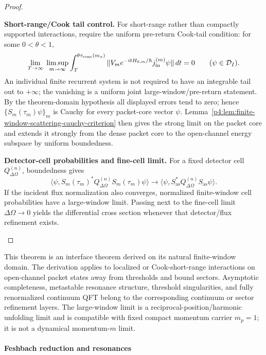 \documentclass[12pt,a4paper]{article}
\begin{document}
\begin{proof}
\begin{proofsteps}
\item \textbf{Short-range/Cook tail control.}
For short-range rather than compactly supported interactions, require the
uniform pre-return Cook-tail condition: for some \(0<\theta<1\),
\[
\lim_{T\to\infty}\;
\limsup_{m\to\infty}
\int_T^{\theta\tau_{\rm cone}(m_x)}
\|V_m e^{-itH_{0,m}/\hbar}j_{\rm in}^{(m)}\psi\|\,dt
=0
\qquad(\psi\in\mathcal D_I).
\]
An individual finite recurrent system is not required to have an integrable
tail out to \(+\infty\); the vanishing is a uniform joint
large-window/pre-return statement.
By the theorem-domain hypothesis all displayed errors tend to zero; hence
\(\{S_m(\tau_m)\psi\}_m\) is Cauchy for every packet-core vector \(\psi\).
Lemma~\ref{p4:lem:finite-window-scattering-cauchy-criterion} then gives the strong limit on the packet core and extends it strongly from the dense packet core to the open-channel energy subspace by uniform boundedness.


\item \textbf{Detector-cell probabilities and fine-cell limit.}
For a fixed detector cell \(Q_{\Delta\Omega}^{(n)}\), boundedness gives
\[
\langle \psi,S_m(\tau_m)^*Q_{\Delta\Omega}^{(n)}S_m(\tau_m)\psi\rangle
\longrightarrow
\langle \psi,S_{\mathrm{as}}^*Q_{\Delta\Omega}^{(n)}S_{\mathrm{as}}\psi\rangle.
\]
If the incident flux normalization also converges, normalized finite-window cell probabilities have a large-window limit.
Passing next to the fine-cell limit \(\Delta\Omega\to0\) yields the differential cross section whenever that detector/flux refinement exists.
\end{proofsteps}

\end{proof}

This theorem is an interface theorem derived on its natural finite-window domain.
The derivation applies to localized or Cook-short-range interactions on open-channel packet states away from thresholds and bound sectors.
Asymptotic completeness, metastable resonance structure, threshold singularities, and fully renormalized continuum QFT belong to the corresponding continuum or sector refinement layers.
The large-window limit is a reciprocal-position/harmonic unfolding limit and is compatible with fixed compact momentum carrier \(m_p=1\); it is not a dynamical momentum-\(m\) limit.



\paragraph{Feshbach reduction and resonances}
\label{p4:sec:part2-feshbach-resonances}
\end{document}
